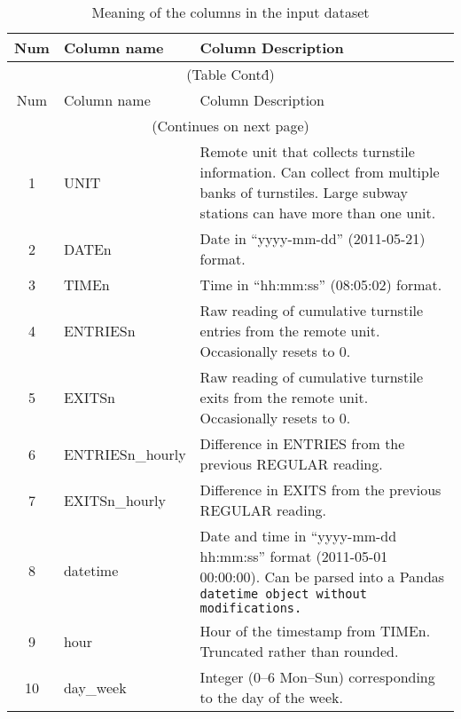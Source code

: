 \documentclass{article}
\begin{document}
\begin{longtable}[h]{c|l|p{8cm}}

\hline
Num & Column name & Column Description \\[3pt]
\hline
\endfirsthead

\multicolumn{3}{c}{(Table Cont\'d)}\\
\hline
Num & Column name & Column Description \\[3pt]
\hline

\endhead

\hline
\multicolumn{3}{c}{(Continues on next page)}\\
\endfoot


\hline
\caption{Meaning of the columns in the input dataset
\label{tab:col_meaning}}
\endlastfoot

 1 & UNIT & Remote unit that collects turnstile information. Can collect from multiple banks of turnstiles. Large subway stations can have more than one unit. \\[3pt]
 
2 & DATEn & Date in “yyyy-mm-dd” (2011-05-21) format. \\[3pt]

3 & TIMEn & Time in “hh:mm:ss” (08:05:02) format. \\[3pt]

4 & ENTRIESn & Raw reading of cumulative turnstile entries from the remote unit. Occasionally resets to 0. \\[3pt]

5 & EXITSn & Raw reading of cumulative turnstile exits from the remote unit. Occasionally resets to 0. \\[3pt]

6 & ENTRIESn\_hourly & Difference in ENTRIES from the previous REGULAR reading.\\[3pt] 

7 & EXITSn\_hourly & Difference in EXITS from the previous REGULAR reading. \\[3pt]

8 & datetime & Date and time in “yyyy-mm-dd hh:mm:ss” format (2011-05-01 00:00:00). Can be parsed into a Pandas \tt datetime \rm object without modifications. \\[3pt]

9 & hour & Hour of the timestamp from TIMEn. Truncated rather than rounded. \\[3pt]

10 & day\_week & Integer (0--6 Mon--Sun) corresponding to the day of the week. \\[3pt]


\end{longtable}
\end{document}
